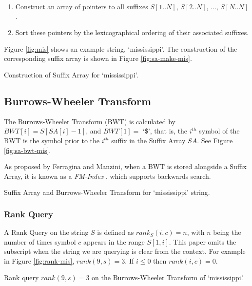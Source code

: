 \begin{enumerate}
	\item
		Construct an array of pointers to all suffixes $S[1..N]$, 
		$S[2..N]$, ..., $S[N..N]$.
	\item
		Sort these pointers by the lexicographical ordering of their associated
		suffixes.
\end{enumerate}

Figure \ref{fig:mis} shows an example string, `mississippi'. The construction of 
the corresponding suffix array is shown in Figure \ref{fig:sa-make-mis}.

			{Construction of Suffix Array for `mississippi'.}



\subsection{Burrows-Wheeler Transform}
The Burrows-Wheeler Transform (BWT) is calculated by $BWT[i] = S[SA[i]-1]$, and $BWT[1] = $ `\$', that is, the $i^{th}$ symbol of the BWT is the symbol prior to the $i^{th}$ suffix in the Suffix Array $SA$. See Figure \ref{fig:sa-bwt-mis}.

As proposed by Ferragina and Manzini, when a BWT is stored alongside a Suffix Array, it is known as a \emph{FM-Index} \cite{fmindex:ferragina2000}, which supports backwards search.

			{Suffix Array and Burrows-Wheeler Transform for
			`mississippi' string.}

\subsubsection{Rank Query}
A Rank Query on the string $S$ is defined as $rank_S(i, c) = n $, with $n$ being 
the number of times symbol $c$ appears in the range $S[1, i]$. This paper omits 
the subscript when the string we are querying is clear from the context. For 
example in Figure \ref{fig:rank-mis}, $rank(9, s) = 3$. If $i \le 0$ then 
$rank(i, c) = 0$.

			{Rank query $rank(9, s) = 3$ on the Burrows-Wheeler Transform
			of `mississippi'.}

